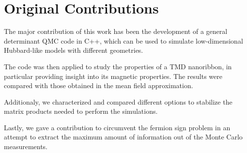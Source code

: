 \section{Original Contributions}
\label{sec:int_contributions}

The major contribution of this work has been the development of a general determinant \ac{QMC} code in C++, which can be used to simulate low-dimensional Hubbard-like models with different geometries.

The code was then applied to study the properties of a \ac{TMD} nanoribbon, in particular providing insight into its magnetic properties.
The results were compared with those obtained in the mean field approximation.

Additionaly, we characterized and compared different options to stabilize the matrix products needed to perform the simulations.

Lastly, we gave a contribution to circumvent the fermion sign problem in an attempt to extract the maximum amount of information out of the Monte Carlo measurements.